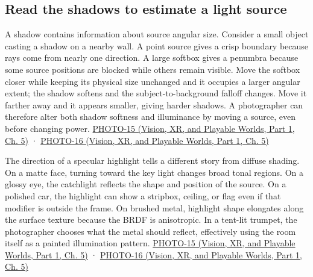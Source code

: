 \subsection{Read the shadows to estimate a light source}\label{03-visual-computing-i-ch004-read-the-shadows-to-estimate-a-light-source}

\hypertarget{03-visual-computing-i-ch004-read-the-shadows-to-estimate-a-light-source}{}

A shadow contains information about source angular size. Consider a small object casting a shadow on a nearby wall. A point source gives a crisp boundary because rays come from nearly one direction. A large softbox gives a penumbra because some source positions are blocked while others remain visible. Move the softbox closer while keeping its physical size unchanged and it occupies a larger angular extent; the shadow softens and the subject-to-background falloff changes. Move it farther away and it appears smaller, giving harder shadows. A photographer can therefore alter both shadow softness and illuminance by moving a source, even before changing power. \href{../07-Vision-XR-and-Playable-Worlds-P01/main.pdf\#nameddest=04-visual-computing-ii-ch036-photo-15---photography-session-15}{PHOTO-15 (Vision, XR, and Playable Worlds, Part 1, Ch. 5)} · \href{../07-Vision-XR-and-Playable-Worlds-P01/main.pdf\#nameddest=04-visual-computing-ii-ch036-photo-16---photography-session-16}{PHOTO-16 (Vision, XR, and Playable Worlds, Part 1, Ch. 5)}

The direction of a specular highlight tells a different story from diffuse shading. On a matte face, turning toward the key light changes broad tonal regions. On a glossy eye, the catchlight reflects the shape and position of the source. On a polished car, the highlight can show a stripbox, ceiling, or flag even if that modifier is outside the frame. On brushed metal, highlight shape elongates along the surface texture because the BRDF is anisotropic. In a tent-lit trumpet, the photographer chooses what the metal should reflect, effectively using the room itself as a painted illumination pattern. \href{../07-Vision-XR-and-Playable-Worlds-P01/main.pdf\#nameddest=04-visual-computing-ii-ch036-photo-15---photography-session-15}{PHOTO-15 (Vision, XR, and Playable Worlds, Part 1, Ch. 5)} · \href{../07-Vision-XR-and-Playable-Worlds-P01/main.pdf\#nameddest=04-visual-computing-ii-ch036-photo-16---photography-session-16}{PHOTO-16 (Vision, XR, and Playable Worlds, Part 1, Ch. 5)}

